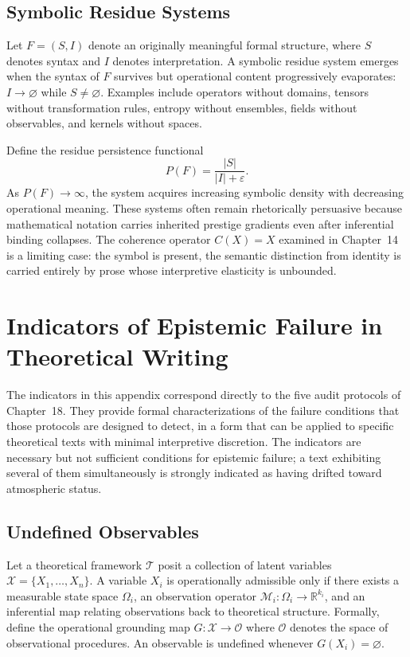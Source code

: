 \documentclass[12pt, openright, twoside]{book}
\begin{document}
\section{Symbolic Residue Systems}

Let $F = (S, I)$ denote an originally meaningful formal structure, where
$S$ denotes syntax and $I$ denotes interpretation. A symbolic residue
system emerges when the syntax of $F$ survives but operational content
progressively evaporates: $I \to \varnothing$ while $S \neq \varnothing$.
Examples include operators without domains, tensors without transformation
rules, entropy without ensembles, fields without observables, and kernels
without spaces.

Define the residue persistence functional
\[
P(F)
= \frac{|S|}{|I| + \varepsilon}.
\]
As $P(F) \to \infty$, the system acquires increasing symbolic density with
decreasing operational meaning. These systems often remain rhetorically
persuasive because mathematical notation carries inherited prestige gradients
even after inferential binding collapses. The coherence operator $C(X) = X$
examined in Chapter~14 is a limiting case: the symbol is present, the
semantic distinction from identity is carried entirely by prose whose
interpretive elasticity is unbounded.

\chapter{Indicators of Epistemic Failure in Theoretical Writing}

The indicators in this appendix correspond directly to the five audit
protocols of Chapter~18. They provide formal characterizations of the
failure conditions that those protocols are designed to detect, in a form
that can be applied to specific theoretical texts with minimal interpretive
discretion. The indicators are necessary but not sufficient conditions for
epistemic failure; a text exhibiting several of them simultaneously is
strongly indicated as having drifted toward atmospheric status.

\section{Undefined Observables}

Let a theoretical framework $\mathcal{T}$ posit a collection of latent
variables $\mathcal{X} = \{X_1, \ldots, X_n\}$. A variable $X_i$ is
operationally admissible only if there exists a measurable state space
$\Omega_i$, an observation operator
$\mathcal{M}_i : \Omega_i \to \mathbb{R}^{k_i}$, and an inferential map
relating observations back to theoretical structure. Formally, define the
operational grounding map $G : \mathcal{X} \to \mathcal{O}$ where
$\mathcal{O}$ denotes the space of observational procedures. An observable
is undefined whenever $G(X_i) = \varnothing$.
\end{document}

